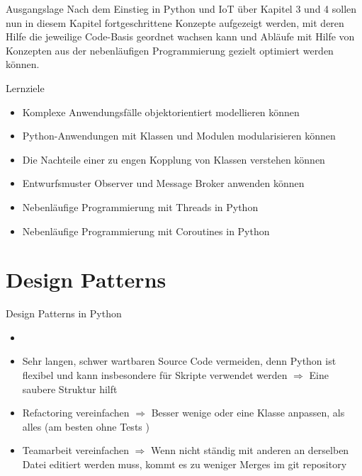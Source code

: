 \begin{frame}{Ausgangslage}
    Nach dem Einstieg in Python und IoT über Kapitel 3 und 4 sollen nun in diesem Kapitel fortgeschrittene Konzepte aufgezeigt werden, mit deren Hilfe die jeweilige Code-Basis geordnet wachsen kann und Abläufe mit Hilfe von Konzepten aus der nebenläufigen Programmierung gezielt optimiert werden können.

    \end{frame}

\begin{frame}{Lernziele}
    \begin{itemize}
        \item Komplexe Anwendungsfälle objektorientiert modellieren können
        \item Python-Anwendungen mit Klassen und Modulen modularisieren können
        \item Die Nachteile einer zu engen Kopplung von Klassen verstehen können
        \item Entwurfsmuster Observer und Message Broker anwenden können
        \item Nebenläufige Programmierung mit Threads in Python
        \item Nebenläufige Programmierung mit Coroutines in Python
    \end{itemize}
\end{frame}


\section{Design Patterns}

\begin{frame}{Design Patterns in Python}
    \begin{itemize}
        \setlength{\itemindent}{2.25in}
        \item [\textbf{Motivation: Design Patterns in Python}]
    \end{itemize}

    \begin{itemize}
        \item Sehr langen, schwer wartbaren Source Code vermeiden, denn Python ist flexibel und kann insbesondere für Skripte verwendet werden  $\Rightarrow$  Eine saubere Struktur hilft
        \item Refactoring vereinfachen  $\Rightarrow$  Besser wenige oder eine Klasse anpassen, als alles (am besten ohne Tests \smiley{} )
        \item Teamarbeit vereinfachen  $\Rightarrow$  Wenn  nicht ständig mit anderen an derselben Datei editiert werden muss, kommt es zu weniger Merges im git repository
   \end{itemize}

  \end{frame}


